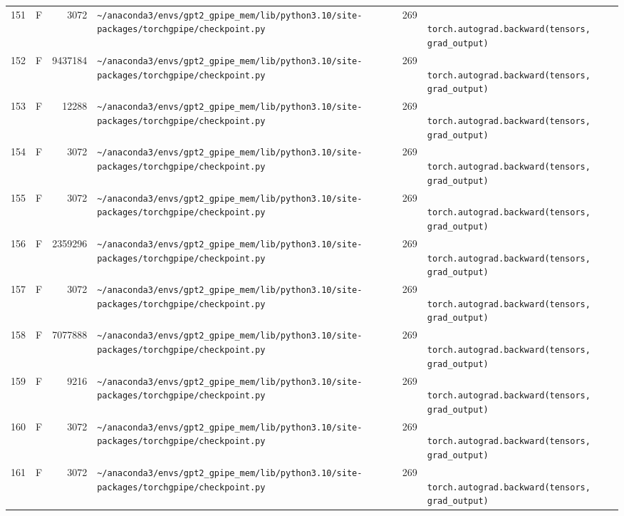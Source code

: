 \documentclass{article}
\begin{document}
\begin{longtable}{r l r p{6.5cm} r p{7.0cm}}
151 & F & 3072 & \lstinline|~/anaconda3/envs/gpt2_gpipe_mem/lib/python3.10/site-packages/torchgpipe/checkpoint.py| & 269 & \lstinline|            torch.autograd.backward(tensors, grad_output)| \\
152 & F & 9437184 & \lstinline|~/anaconda3/envs/gpt2_gpipe_mem/lib/python3.10/site-packages/torchgpipe/checkpoint.py| & 269 & \lstinline|            torch.autograd.backward(tensors, grad_output)| \\
153 & F & 12288 & \lstinline|~/anaconda3/envs/gpt2_gpipe_mem/lib/python3.10/site-packages/torchgpipe/checkpoint.py| & 269 & \lstinline|            torch.autograd.backward(tensors, grad_output)| \\
154 & F & 3072 & \lstinline|~/anaconda3/envs/gpt2_gpipe_mem/lib/python3.10/site-packages/torchgpipe/checkpoint.py| & 269 & \lstinline|            torch.autograd.backward(tensors, grad_output)| \\
155 & F & 3072 & \lstinline|~/anaconda3/envs/gpt2_gpipe_mem/lib/python3.10/site-packages/torchgpipe/checkpoint.py| & 269 & \lstinline|            torch.autograd.backward(tensors, grad_output)| \\
156 & F & 2359296 & \lstinline|~/anaconda3/envs/gpt2_gpipe_mem/lib/python3.10/site-packages/torchgpipe/checkpoint.py| & 269 & \lstinline|            torch.autograd.backward(tensors, grad_output)| \\
157 & F & 3072 & \lstinline|~/anaconda3/envs/gpt2_gpipe_mem/lib/python3.10/site-packages/torchgpipe/checkpoint.py| & 269 & \lstinline|            torch.autograd.backward(tensors, grad_output)| \\
158 & F & 7077888 & \lstinline|~/anaconda3/envs/gpt2_gpipe_mem/lib/python3.10/site-packages/torchgpipe/checkpoint.py| & 269 & \lstinline|            torch.autograd.backward(tensors, grad_output)| \\
159 & F & 9216 & \lstinline|~/anaconda3/envs/gpt2_gpipe_mem/lib/python3.10/site-packages/torchgpipe/checkpoint.py| & 269 & \lstinline|            torch.autograd.backward(tensors, grad_output)| \\
160 & F & 3072 & \lstinline|~/anaconda3/envs/gpt2_gpipe_mem/lib/python3.10/site-packages/torchgpipe/checkpoint.py| & 269 & \lstinline|            torch.autograd.backward(tensors, grad_output)| \\
161 & F & 3072 & \lstinline|~/anaconda3/envs/gpt2_gpipe_mem/lib/python3.10/site-packages/torchgpipe/checkpoint.py| & 269 & \lstinline|            torch.autograd.backward(tensors, grad_output)| \\

\end{longtable}
\end{document}
